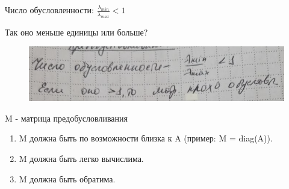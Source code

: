 \documentclass{bmstu}
\begin{document}
	Число обусловленности: $\frac{\lambda_{min}}{\lambda_{max}}<1$
	
	Так оно меньше единицы или больше?
	\begin{figure}[h]
		\includegraphics[height=0.2\linewidth]{уааа.png}
	\end{figure}
	
	M - матрица предобусловливания
	
	\begin{enumerate}
		\item M должна быть по возможности близка к A (пример: M = diag(A)).
		\item M должна быть легко вычислима.
		\item M должна быть обратима.
	\end{enumerate}
\end{document}
